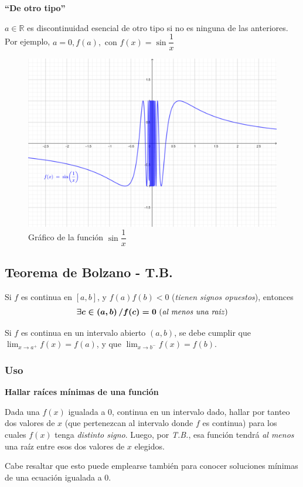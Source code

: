 \documentclass[11pt,titlepage]{article}
\newcommand{\commLim}[2]{\lim_{#1 \to #2}}
\newcommand{\littleTitle}[1]{
	\noindent \ignorespaces
	\small \textbf{#1} \normalsize
	\ignorespaces \ignorespacesafterend
}
\newcommand{\comillas}[1]{``#1''}
\begin{document}
\littleTitle{\comillas{De otro tipo}}\par
$a \in \mathbb{R}$ es discontinuidad esencial de otro tipo si no es ninguna de las anteriores. Por ejemplo, $a = 0, f(a), \text{ con } f(x) = \sin \dfrac{1}{x}$
\begin{figure}[htb!]
	\centering 
	\includegraphics[scale=1.5]{discontinuidad_otro_tipo.png}
	\caption{Gráfico de la función $\sin \dfrac{1}{x}$}
	\label{fig:discontinuidad_otro_tipo}
\end{figure}

\pagebreak

\subsection{Teorema de Bolzano - T.B.}
\begin{commBoxy}
	Si $f$ es continua en $[a,b]$, y $f(a)f(b) < 0$ (\emph{tienen signos opuestos}), entonces 
	\begin{equation}
		\boldsymbol{\exists c \in \left(a,b\right) / f(c) = 0} \text{ (\emph{al menos una raiz})}
	\end{equation}
\end{commBoxy}
Si $f$ es continua en un intervalo abierto $\left(a,b\right)$, se debe cumplir que $\commLim{x}{a^{+}} f(x) = f(a)$, y que $\commLim{x}{b^{-}} f(x) = f(b).$

\subsubsection{Uso}
\littleTitle{Hallar raíces mínimas de una función}\par
Dada una $f(x)$ igualada a $0$, continua en un intervalo dado, hallar por tanteo dos valores de $x$ (que pertenezcan 
al intervalo donde $f$ es continua) para los cuales $f(x)$ tenga \emph{distinto signo}. Luego, por \emph{T.B.}, esa 
función tendrá \emph{al menos} una raíz entre esos dos valores de $x$ elegidos.\par
Cabe resaltar que esto puede emplearse también para conocer soluciones mínimas de una ecuación igualada a $0$.
\end{document}
